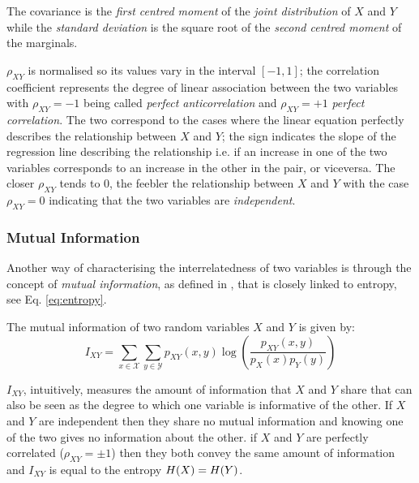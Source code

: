 The covariance is the \textit{first centred moment} of the \textit{joint distribution} of $X$ and $Y$ while the \textit{standard deviation} is the square root of the \textit{second centred moment} of the marginals.

$\rho_{XY}$ is normalised so its values vary in the interval $[-1,1]$; the correlation coefficient represents the degree of linear association between the two variables with $\rho_{XY}=-1$ being called \textit{perfect anticorrelation} and $\rho_{XY}=+1$ \textit{perfect correlation}.
The two correspond to the cases where the linear equation perfectly describes the relationship between $X$ and $Y$; the sign indicates the slope of the regression line describing the relationship i.e. if an increase in one of the two variables corresponds to an increase in the other in the pair, or viceversa.
The closer $\rho_{XY}$ tends to $0$, the feebler the relationship between $X$ and $Y$ with the case $\rho_{XY}=0$ indicating that the two variables are \textit{independent}.

\subsubsection{Mutual Information} \label{subsec:mutualinformation}
Another way of characterising the interrelatedness of two variables is through the concept of \textit{mutual information}, as defined in \cite{Cover2006}, that is closely linked to entropy, see Eq. \ref{eq:entropy}.
\begin{definition}
	The mutual information of two random variables $X$ and $Y$ is given by:
	\begin{equation}
		I_{XY} = \sum_{x \in \mathcal{X}} \sum_{y \in \mathcal{Y}} p_{XY}(x,y) \log \left( \frac{p_{XY}(x, y)}{p_{X}(x) p_{Y}(y)} \right)
	\end{equation}
\end{definition}
$I_{XY}$, intuitively, measures the amount of information that $X$ and $Y$ share that can also be seen as the degree to which one variable is informative of the other.
If $X$ and $Y$ are independent then they share no mutual information and knowing one of the two gives no information about the other.
if $X$ and $Y$ are perfectly correlated ($\rho_{XY}= \pm 1$) then they both convey the same amount of information and $I_{XY}$ is equal to the entropy $H(X) = H(Y)$.


